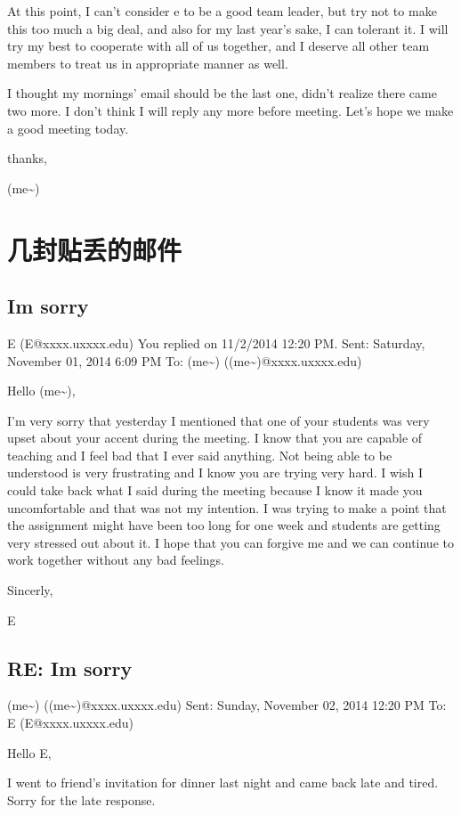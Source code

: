 \documentclass[12pt]{book}
\begin{document}
At this point, I can't consider e to be a good team leader, but try not to make this too much a big deal, and also for my last year's sake, I can tolerant it. I will try my best to cooperate with all of us together, and I deserve all other team members to treat us in appropriate manner as well. 

I thought my mornings' email should be the last one, didn't realize there came two more. I don't think I will reply any more before meeting. Let's hope we make a good meeting today.

thanks,

(me\textasciitilde{})

\chapter{几封贴丢的邮件}
\label{sec-23}
\section{Im sorry}
\label{sec-23-1}
E (E@xxxx.uxxxx.edu)
You replied on 11/2/2014 12:20 PM.
Sent:        Saturday, November 01, 2014 6:09 PM
To:        
(me\textasciitilde{}) ((me\textasciitilde{})@xxxx.uxxxx.edu)

Hello (me\textasciitilde{}),

I'm very sorry that yesterday I mentioned that one of your students was very upset about your accent during the meeting. I know that you are capable of teaching and I feel bad that I ever said anything. Not being able to be understood is very frustrating and I know you are trying very hard. I wish I could take back what I said during the meeting because I know it made you uncomfortable and that was not my intention. I was trying to make a point that the assignment might have been too long for one week and students are getting very stressed out about it.  I hope that you can forgive me and we can continue to work together without any bad feelings.

Sincerly,

E

\section{RE: Im sorry}
\label{sec-23-2}
(me\textasciitilde{}) ((me\textasciitilde{})@xxxx.uxxxx.edu)
Sent:        Sunday, November 02, 2014 12:20 PM
To:        
E (E@xxxx.uxxxx.edu)

Hello E, 

I went to friend's invitation for dinner last night and came back late and tired. Sorry for the late response. 
\end{document}
